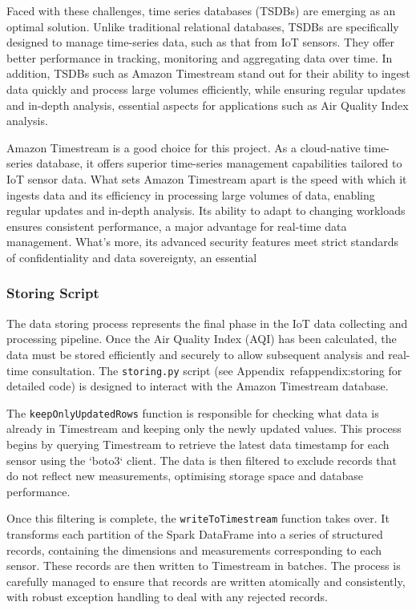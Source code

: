 \documentclass[12pt,oneside]{book} %
\begin{document}
Faced with these challenges, time series databases (TSDBs) are emerging as an
optimal solution. Unlike traditional relational databases, TSDBs are
specifically designed to manage time-series data, such as that from IoT
sensors. They offer better performance in tracking, monitoring and aggregating
data over time. In addition, TSDBs such as Amazon Timestream stand out for
their ability to ingest data quickly and process large volumes efficiently,
while ensuring regular updates and in-depth analysis, essential aspects for
applications such as Air Quality Index analysis.

Amazon Timestream is a good choice for this project. As a cloud-native
time-series database, it offers superior time-series management capabilities
tailored to IoT sensor data. What sets Amazon Timestream apart is the speed
with which it ingests data and its efficiency in processing large volumes of
data, enabling regular updates and in-depth analysis. Its ability to adapt to
changing workloads ensures consistent performance, a major advantage for
real-time data management. What's more, its advanced security features meet
strict standards of confidentiality and data sovereignty, an essential

\subsubsection{Storing Script}
The data storing process represents the final phase in the IoT data collecting
and processing pipeline. Once the Air Quality Index (AQI) has been calculated,
the data must be stored efficiently and securely to allow subsequent analysis
and real-time consultation. The \texttt{storing.py} script (see
Appendix~ref{appendix:storing} for detailed code) is designed to interact with
the Amazon Timestream database.

The \texttt{keepOnlyUpdatedRows} function is responsible for checking what data
is already in Timestream and keeping only the newly updated values. This
process begins by querying Timestream to retrieve the latest data timestamp for
each sensor using the `boto3` client. The data is then filtered to exclude
records that do not reflect new measurements, optimising storage space and
database performance.

Once this filtering is complete, the \texttt{writeToTimestream} function takes
over. It transforms each partition of the Spark DataFrame into a series of
structured records, containing the dimensions and measurements corresponding to
each sensor. These records are then written to Timestream in batches. The
process is carefully managed to ensure that records are written atomically and
consistently, with robust exception handling to deal with any rejected records.
\end{document}

